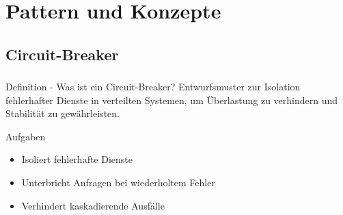 \section{Pattern und Konzepte}
\subsection{\textbf{Circuit-Breaker}}

\begin{frame}
    \frametitle{\insertsection}
    \framesubtitle{\insertsubsection}
    \begin{block}{Definition - Was ist ein Circuit-Breaker?}
        Entwurfsmuster zur Isolation fehlerhafter Dienste in verteilten Systemen, um Überlastung zu verhindern
        und Stabilität zu gewährleisten.
    \end{block}
    \begin{block}{Aufgaben}
        \begin{itemize}
            \item Isoliert fehlerhafte Dienste
            \item Unterbricht Anfragen bei wiederholtem Fehler
            \item Verhindert kaskadierende Ausfälle
        \end{itemize}
    \end{block}
\end{frame}

